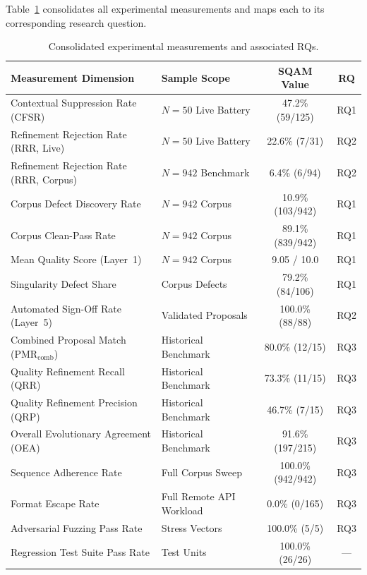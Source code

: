 \documentclass[journal]{IEEEtran}
\begin{document}
Table~\ref{tab:summary} consolidates all experimental measurements and maps each to its corresponding research question.

\begin{table}[htbp]
\centering
\caption{Consolidated experimental measurements and associated RQs.}
\label{tab:summary}
\small
\setlength{\tabcolsep}{3pt}
\begin{tabularx}{\columnwidth}{@{}>{\raggedright\arraybackslash}X>{\raggedright\arraybackslash}Xcc@{}}
\toprule
\textbf{Measurement Dimension} & \textbf{Sample Scope} & \textbf{SQAM Value} & \textbf{RQ} \\
\midrule
Contextual Suppression Rate (CFSR)      & $N=50$ Live Battery     & 47.2\% (59/125)& RQ1 \\
Refinement Rejection Rate (RRR, Live)   & $N=50$ Live Battery     & 22.6\% (7/31)  & RQ2 \\
Refinement Rejection Rate (RRR, Corpus) & $N=942$ Benchmark       & 6.4\% (6/94)   & RQ2 \\
Corpus Defect Discovery Rate            & $N=942$ Corpus          & 10.9\% (103/942)& RQ1 \\
Corpus Clean-Pass Rate                  & $N=942$ Corpus          & 89.1\% (839/942)& RQ1 \\
Mean Quality Score (Layer~1)            & $N=942$ Corpus          & 9.05 / 10.0    & RQ1 \\
Singularity Defect Share                & 106 Corpus Defects      & 79.2\% (84/106)& RQ1 \\
Automated Sign-Off Rate (Layer~5)       & 88 Validated Proposals  & 100.0\% (88/88)& RQ2 \\
Combined Proposal Match (PMR$_{\text{comb}}$) & Historical Benchmark & 80.0\% (12/15) & RQ3 \\
Quality Refinement Recall (QRR)         & Historical Benchmark    & 73.3\% (11/15) & RQ3 \\
Quality Refinement Precision (QRP)      & Historical Benchmark    & 46.7\% (7/15)  & RQ3 \\
Overall Evolutionary Agreement (OEA)    & Historical Benchmark    & 91.6\% (197/215)& RQ3 \\
Sequence Adherence Rate                 & Full Corpus Sweep       & 100.0\% (942/942)& RQ3 \\
Format Escape Rate                      & Full Remote API Workload& 0.0\% (0/165)  & RQ3 \\
Adversarial Fuzzing Pass Rate           & 5 Stress Vectors        & 100.0\% (5/5)  & RQ3 \\
Regression Test Suite Pass Rate         & 26 Test Units           & 100.0\% (26/26)& --- \\
\bottomrule
\end{tabularx}
\end{table}
\end{document}
